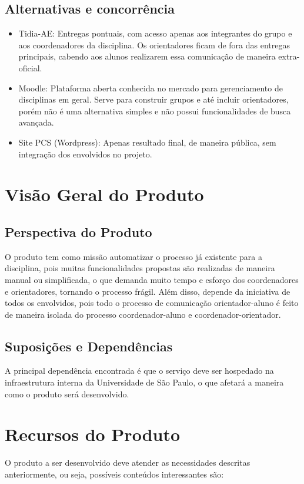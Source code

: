 \subsection{Alternativas e concorrência}
\begin{itemize}
    \item Tidia-AE: Entregas pontuais, com acesso apenas aos integrantes do grupo e aos coordenadores da disciplina. Os orientadores ficam de fora das entregas principais, cabendo aos alunos realizarem essa comunicação de maneira extra-oficial.
    \item Moodle: Plataforma aberta conhecida no mercado para gerenciamento de disciplinas em geral. Serve para construir grupos e até incluir orientadores, porém não é uma alternativa simples e não possui funcionalidades de busca avançada.
    \item Site PCS (Wordpress): Apenas resultado final, de maneira pública, sem integração dos envolvidos no projeto.
\end{itemize}

\section{Visão Geral do Produto}
\subsection{Perspectiva do Produto}
O produto tem como missão automatizar o processo já existente para a disciplina, pois muitas funcionalidades propostas são realizadas de maneira manual ou simplificada, o que demanda muito tempo e esforço dos coordenadores e orientadores, tornando o processo frágil. Além disso, depende da iniciativa de todos os envolvidos, pois todo o processo de comunicação orientador-aluno é feito de maneira isolada do processo coordenador-aluno e coordenador-orientador.

\subsection{Suposições e Dependências}
A principal dependência encontrada é que o serviço deve ser hospedado na infraestrutura interna da Universidade de São Paulo, o que afetará a maneira como o produto será desenvolvido.
  
\section{Recursos do Produto}
O produto a ser desenvolvido deve atender as necessidades descritas anteriormente, ou seja, possíveis conteúdos interessantes são:

